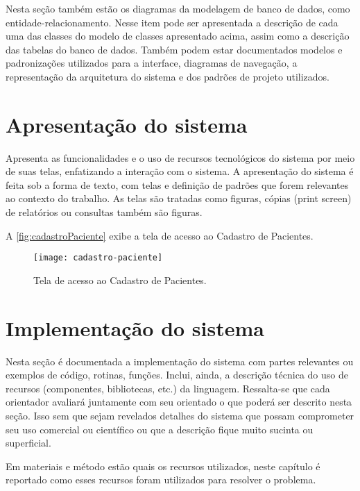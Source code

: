 Nesta seção também estão os diagramas da modelagem de banco de dados, como entidade-relacionamento. Nesse item pode ser apresentada a descrição de cada uma das classes do modelo de classes apresentado acima, assim como a descrição das tabelas do banco de dados. Também podem estar documentados modelos e padronizações utilizados para a interface, diagramas de navegação, a representação da arquitetura do sistema e dos padrões de projeto utilizados.

\section{Apresentação do sistema}\label{sec:apresentacaoSistema}

Apresenta as funcionalidades e o uso de recursos tecnológicos do sistema por meio de suas telas, enfatizando a interação com o sistema. A apresentação do sistema é feita sob a forma de texto, com telas e definição de padrões que forem relevantes ao contexto do trabalho. As telas são tratadas como figuras, cópias (print screen) de relatórios ou consultas também são figuras.

A \autoref{fig:cadastroPaciente} exibe a tela de acesso ao Cadastro de Pacientes.

\begin{figure}[htpb]%
  \captionsetup{width=0.43\textwidth}
  \caption{Tela de acesso ao Cadastro de Pacientes.}%
  \label{fig:cadastroPaciente}%
  \texttt{[image: cadastro-paciente]}%
  \fonte{}%
\end{figure}

\section{Implementação do sistema}\label{sec:implementacaoSistema}

Nesta seção é documentada a implementação do sistema com partes relevantes ou exemplos de código, rotinas, funções. Inclui, ainda, a descrição técnica do uso de recursos (componentes, bibliotecas, etc.) da linguagem. Ressalta-se que cada orientador avaliará juntamente com seu orientado o que poderá ser descrito nesta seção. Isso sem que sejam revelados detalhes do sistema que possam comprometer seu uso comercial ou científico ou que a descrição fique muito sucinta ou superficial.

Em materiais e método estão quais os recursos utilizados, neste capítulo é reportado como esses recursos foram utilizados para resolver o problema.

